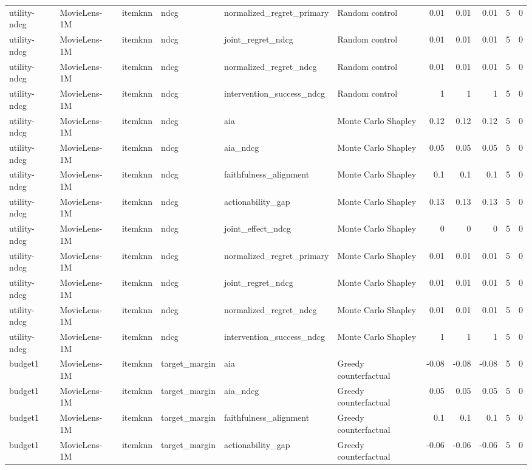 \begin{table}[t]
{\begin{tabular}{llllllrrrrr}
utility-ndcg & MovieLens-1M & itemknn & ndcg & normalized\_regret\_primary & Random control & 0.01 & 0.01 & 0.01 & 5 & 0 \\
utility-ndcg & MovieLens-1M & itemknn & ndcg & joint\_regret\_ndcg & Random control & 0.01 & 0.01 & 0.01 & 5 & 0 \\
utility-ndcg & MovieLens-1M & itemknn & ndcg & normalized\_regret\_ndcg & Random control & 0.01 & 0.01 & 0.01 & 5 & 0 \\
utility-ndcg & MovieLens-1M & itemknn & ndcg & intervention\_success\_ndcg & Random control & 1 & 1 & 1 & 5 & 0 \\
utility-ndcg & MovieLens-1M & itemknn & ndcg & aia & Monte Carlo Shapley & 0.12 & 0.12 & 0.12 & 5 & 0 \\
utility-ndcg & MovieLens-1M & itemknn & ndcg & aia\_ndcg & Monte Carlo Shapley & 0.05 & 0.05 & 0.05 & 5 & 0 \\
utility-ndcg & MovieLens-1M & itemknn & ndcg & faithfulness\_alignment & Monte Carlo Shapley & 0.1 & 0.1 & 0.1 & 5 & 0 \\
utility-ndcg & MovieLens-1M & itemknn & ndcg & actionability\_gap & Monte Carlo Shapley & 0.13 & 0.13 & 0.13 & 5 & 0 \\
utility-ndcg & MovieLens-1M & itemknn & ndcg & joint\_effect\_ndcg & Monte Carlo Shapley & 0 & 0 & 0 & 5 & 0 \\
utility-ndcg & MovieLens-1M & itemknn & ndcg & normalized\_regret\_primary & Monte Carlo Shapley & 0.01 & 0.01 & 0.01 & 5 & 0 \\
utility-ndcg & MovieLens-1M & itemknn & ndcg & joint\_regret\_ndcg & Monte Carlo Shapley & 0.01 & 0.01 & 0.01 & 5 & 0 \\
utility-ndcg & MovieLens-1M & itemknn & ndcg & normalized\_regret\_ndcg & Monte Carlo Shapley & 0.01 & 0.01 & 0.01 & 5 & 0 \\
utility-ndcg & MovieLens-1M & itemknn & ndcg & intervention\_success\_ndcg & Monte Carlo Shapley & 1 & 1 & 1 & 5 & 0 \\
budget1 & MovieLens-1M & itemknn & target\_margin & aia & Greedy counterfactual & -0.08 & -0.08 & -0.08 & 5 & 0 \\
budget1 & MovieLens-1M & itemknn & target\_margin & aia\_ndcg & Greedy counterfactual & 0.05 & 0.05 & 0.05 & 5 & 0 \\
budget1 & MovieLens-1M & itemknn & target\_margin & faithfulness\_alignment & Greedy counterfactual & 0.1 & 0.1 & 0.1 & 5 & 0 \\
budget1 & MovieLens-1M & itemknn & target\_margin & actionability\_gap & Greedy counterfactual & -0.06 & -0.06 & -0.06 & 5 & 0 \\

\end{tabular}}
\end{table}
